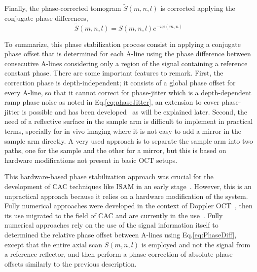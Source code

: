 Finally, the phase-corrected tomogram $\tilde{S}(m,n,l)$ is corrected applying the conjugate phase differences,
\begin{equation}
	\tilde{S}(m,n,l) = S(m,n,l)e^{-i\varphi(m,n)}
\end{equation}

To summarize, this phase stabilization process consist in applying a conjugate phase offset that is determined for each A-line using the phase difference between consecutive A-lines considering only a region of the signal containing a reference constant phase. There are some important features to remark. First, the correction phase is depth-independent; it consists of a global phase offset for every A-line, so that it cannot correct for phase-jitter which is a depth-dependent ramp phase noise as noted in Eq.\eqref{eq:phaseJitter}, an extension to cover phase-jitter is possible and has been developed~\cite{Vakoc2005_Phaseresolved} as will be explained later. Second, the need of a reflective surface in the sample arm is difficult to implement in practical terms, specially for in vivo imaging where it is not easy to add a mirror in the sample arm directly. A very used approach is to separate the sample arm into two paths, one for the sample and the other for a mirror, but this is based on hardware modifications not present in basic OCT setups. 

This hardware-based phase stabilization approach was crucial for the development of CAC techniques like ISAM in an early stage~\cite{Ralston2006_Phase}. However, this is an unpractical approach because it relies on a hardware modification of the system. Fully numerical approaches were developed in the context of Doppler OCT~\cite{White2003_vivo}, then its use migrated to the field of CAC and are currently in the use~\cite{Shemonski2014_Threedimensional}. Fully numerical approaches rely on the use of the signal information itself to determined the relative phase offset between A-lines using Eq.\eqref{eq:PhaseDiff}, except that the entire axial scan $S(m,n,l)$ is employed and not the signal from a reference reflector, and then perform a phase correction of absolute phase offsets similarly to the previous description.

